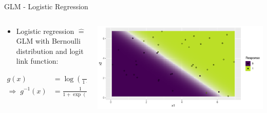 \documentclass[11pt,compress,t,notes=noshow, aspectratio=169, xcolor=table]{beamer}
\begin{document}
\begin{frame}{GLM - Logistic Regression}
\begin{columns}[T, totalwidth=\textwidth]
\begin{column}{0.5\textwidth}

\begin{itemize}
    \item Logistic regression $\hat{=}$ GLM with Bernoulli distribution and logit link function: 
\end{itemize}
\begin{align*}
    g(x) &= \log\left(\frac{x}{1 - x}\right) \\ 
    \Rightarrow \; g^{-1}(x) &= \frac{1}{1+\exp(-x)}
\end{align*}
\end{column}
\begin{column}{0.5\textwidth}

\includegraphics[width = \textwidth]{figure/reg_class_log_6.pdf}
\end{column}
\end{columns}

\smallskip


\end{frame}
\end{document}
